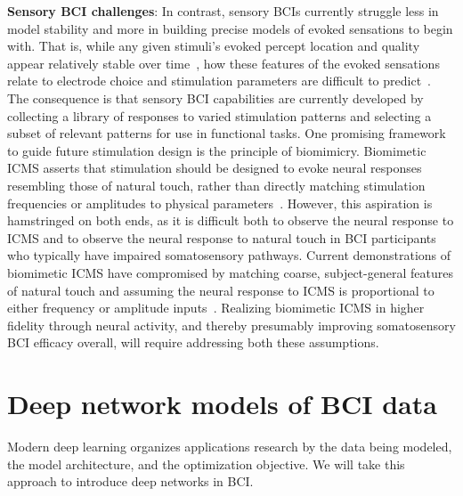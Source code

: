 \documentclass[12pt,oneside]{report}
\begin{document}
\textbf{Sensory BCI challenges}: In contrast, sensory BCIs currently struggle less in model stability and more in building precise models of evoked sensations to begin with. That is, while any given stimuli's evoked percept location and quality appear relatively stable over time~\citep{greenspon_25_stable}, how these features of the evoked sensations relate to electrode choice and stimulation parameters are difficult to predict~\citep{hughes2021perception}. The consequence is that sensory BCI capabilities are currently developed by collecting a library of responses to varied stimulation patterns and selecting a subset of relevant patterns for use in functional tasks. One promising framework to guide future stimulation design is the principle of biomimicry. Biomimetic ICMS asserts that stimulation should be designed to evoke neural responses resembling those of natural touch, rather than directly matching stimulation frequencies or amplitudes to physical parameters~\citep{bensmaia2023restoration}. However, this aspiration is hamstringed on both ends, as it is difficult both to observe the neural response to ICMS and to observe the neural response to natural touch in BCI participants who typically have impaired somatosensory pathways. Current demonstrations of biomimetic ICMS have compromised by matching coarse, subject-general features of natural touch and assuming the neural response to ICMS is proportional to either frequency or amplitude inputs~\citep{valle2025tactile,hobbs2025biomimetic,greenspon_25_stable}. Realizing biomimetic ICMS in higher fidelity through neural activity, and thereby presumably improving somatosensory BCI efficacy overall, will require addressing both these assumptions.


\section{Deep network models of BCI data}
\label{sec:deep_networks}

Modern deep learning organizes applications research by the data being modeled, the model architecture, and the optimization objective. We will take this approach to introduce deep networks in BCI.
\end{document}
